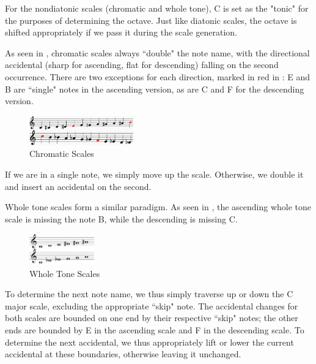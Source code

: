 \documentclass{article}
\begin{document}
For the nondiatonic scales (chromatic and whole tone), C is set as the "tonic" for the purposes of determining the octave. Just like diatonic scales, the octave is shifted appropriately if we pass it during the scale generation.

As seen in , chromatic scales always ``double" the note name, with the directional accidental (sharp for ascending, flat for descending) falling on the second occurrence. There are two exceptions for each direction, marked in red in : E and B are ``single" notes in the ascending version, as are C and F for the descending version.

\begin{figure}[h!]
\centering
\includegraphics[width=0.4\textwidth]{images/chromatic}
\caption{Chromatic Scales}
\label{chromatic}
\vspace{-5mm}
\end{figure}

If we are in a single note, we simply move up the scale. Otherwise, we double it and insert an accidental on the second.

Whole tone scales form a similar paradigm. As seen in , the ascending whole tone scale is missing the note B, while the descending is missing C. 

\begin{figure}[h!]
\centering
\includegraphics[width=0.25\textwidth]{images/whole_tone}
\caption{Whole Tone Scales}
\label{chromatic}
\vspace{-5mm}
\end{figure}

To determine the next note name, we thus simply traverse up or down the C major scale, excluding the appropriate ``skip" note. The accidental changes for both scales are bounded on one end by their respective ``skip" notes; the other ends are bounded by E in the ascending scale and F in the descending scale. To determine the next accidental, we thus appropriately lift or lower the current accidental at these boundaries, otherwise leaving it unchanged.
\end{document}
